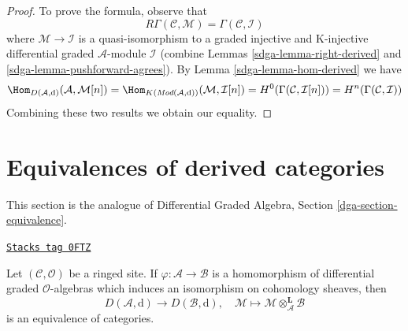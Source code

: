 \begin{proof}

To prove the formula, observe that
$$
R\Gamma(\mathcal{C}, \mathcal{M}) = \Gamma(\mathcal{C}, \mathcal{I})
$$
where $\mathcal{M} \to \mathcal{I}$ is a quasi-isomorphism
to a graded injective and K-injective differential graded
$\mathcal{A}$-module $\mathcal{I}$ (combine
Lemmas \ref{sdga-lemma-right-derived} and \ref{sdga-lemma-pushforward-agrees}).
By Lemma \ref{sdga-lemma-hom-derived} we have
$$
\Hom_{D(\mathcal{A}, \text{d})}(\mathcal{A}, \mathcal{M}[n]) =
\Hom_{K(\textit{Mod}(\mathcal{A}, \text{d}))}(\mathcal{M}, \mathcal{I}[n]) =
H^0(\Gamma(\mathcal{C}, \mathcal{I}[n])) =
H^n(\Gamma(\mathcal{C}, \mathcal{I}))
$$
Combining these two results we obtain our equality.
\end{proof}

\section{Equivalences of derived categories}
\label{sdga-section-equivalence}
This section is the analogue of
Differential Graded Algebra, Section \ref{dga-section-equivalence}.

\begin{lemma}
\label{sdga-lemma-qis-equivalence}
\href{https://stacks.math.columbia.edu/tag/0FTZ}{\texttt{Stacks tag 0FTZ}}

Let $(\mathcal{C}, \mathcal{O})$ be a ringed site.
If $\varphi : \mathcal{A} \to \mathcal{B}$ is a homomorphism of
differential graded $\mathcal{O}$-algebras which induces an
isomorphism on cohomology sheaves, then
$$
D(\mathcal{A}, \text{d}) \longrightarrow D(\mathcal{B}, \text{d}), \quad
\mathcal{M}
\longmapsto
\mathcal{M} \otimes_\mathcal{A}^\mathbf{L} \mathcal{B}
$$
is an equivalence of categories.
\end{lemma}


